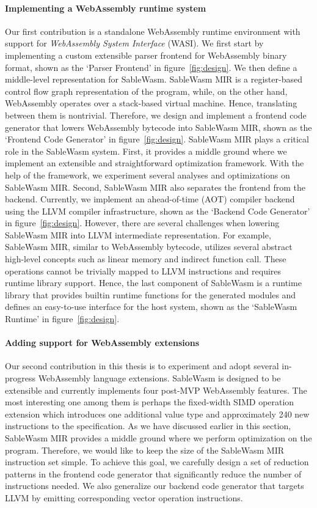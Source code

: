 \paragraph{Implementing a WebAssembly runtime system}
Our first contribution is a standalone WebAssembly runtime environment with
support for \emph{WebAssembly System Interface} (WASI). We first start by
implementing a custom extensible parser frontend for WebAssembly binary format,
shown as the `Parser Frontend' in figure~\ref{fig:design}.
We then define a middle-level representation for SableWasm. SableWasm MIR is a
register-based control flow graph representation of the program, while, on the
other hand, WebAssembly operates over a stack-based virtual machine. Hence,
translating between them is nontrivial. Therefore, we design and implement a
frontend code generator that lowers WebAssembly bytecode into SableWasm MIR,
shown as the `Frontend Code Generator' in figure~\ref{fig:design}.
SableWasm MIR plays a critical role in the SableWasm system. First, it provides
a middle ground where we implement an extensible and straightforward
optimization framework. With the help of the framework, we experiment several
analyses and optimizations on SableWasm MIR. Second, SableWasm MIR also
separates the frontend from the backend. Currently, we implement an
ahead-of-time (AOT) compiler backend using the LLVM compiler infrastructure,
shown as the `Backend Code Generator' in figure~\ref{fig:design}.
However, there are several challenges when lowering SableWasm MIR into LLVM
intermediate representation. For example, SableWasm MIR, similar to WebAssembly
bytecode, utilizes several abstract high-level concepts such as linear memory
and indirect function call. These operations cannot be trivially mapped to LLVM
instructions and requires runtime library support. Hence, the last component of
SableWasm is a runtime library that provides builtin runtime functions for the
generated modules and defines an easy-to-use interface for the host system,
shown as the `SableWasm Runtime' in figure~\ref{fig:design}.

\paragraph{Adding support for WebAssembly extensions}
Our second contribution in this thesis is to experiment and adopt several
in-progress WebAssembly language extensions. SableWasm is designed to be
extensible and currently implements four post-MVP WebAssembly features. The
most interesting one among them is perhaps the fixed-width SIMD operation
extension which introduces one additional value type and approximately 240
new instructions to the specification. As we have discussed earlier in this
section, SableWasm MIR provides a middle ground where we perform optimization
on the program. Therefore, we would like to keep the size of the SableWasm MIR
instruction set simple. To achieve this goal, we carefully design a set of
reduction patterns in the frontend code generator that significantly reduce the
number of instructions needed. We also generalize our backend code generator
that targets LLVM by emitting corresponding vector operation instructions.

